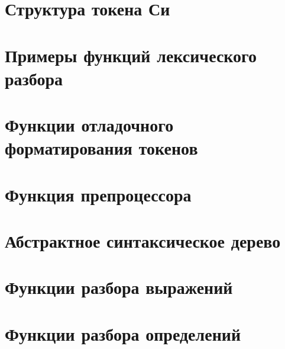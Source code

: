 \section*{Структура токена Си}


\section*{Примеры функций лексического разбора}


\section*{Функции отладочного форматирования токенов}



\section*{Функция препроцессора}



\section*{Абстрактное синтаксическое дерево}


\section*{Функции разбора выражений}


\section*{Функции разбора определений}


